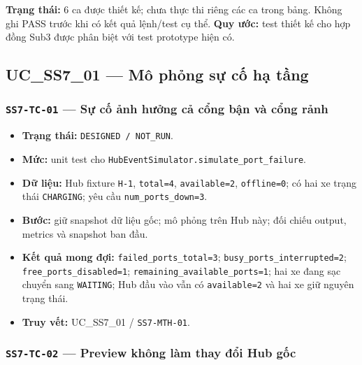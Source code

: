 \documentclass[11pt,a4paper]{article}
\providecommand{\tightlist}{%
  \setlength{\itemsep}{0pt}\setlength{\parskip}{0pt}}
\begin{document}
\textbf{Trạng thái:} 6 ca được thiết kế; chưa thực thi riêng các ca
trong bảng. Không ghi PASS trước khi có kết quả lệnh/test cụ thể.
\textbf{Quy ước:} test thiết kế cho hợp đồng Sub3 được phân biệt với
test prototype hiện có.

\hypertarget{uc_ss7_01-muxf4-phux1ecfng-sux1ef1-cux1ed1-hux1ea1-tux1ea7ng}{%
\subsection{UC\_SS7\_01 --- Mô phỏng sự cố hạ
tầng}\label{uc_ss7_01-muxf4-phux1ecfng-sux1ef1-cux1ed1-hux1ea1-tux1ea7ng}}

\hypertarget{ss7-tc-01-sux1ef1-cux1ed1-ux1ea3nh-hux1b0ux1edfng-cux1ea3-cux1ed5ng-bux1eadn-vuxe0-cux1ed5ng-rux1ea3nh}{%
\subsubsection{\texorpdfstring{\texttt{SS7-TC-01} --- Sự cố ảnh hưởng cả
cổng bận và cổng
rảnh}{SS7-TC-01 --- Sự cố ảnh hưởng cả cổng bận và cổng rảnh}}\label{ss7-tc-01-sux1ef1-cux1ed1-ux1ea3nh-hux1b0ux1edfng-cux1ea3-cux1ed5ng-bux1eadn-vuxe0-cux1ed5ng-rux1ea3nh}}

\begin{itemize}
\tightlist
\item
  \textbf{Trạng thái:} \texttt{DESIGNED\ /\ NOT\_RUN}.
\item
  \textbf{Mức:} unit test cho
  \texttt{HubEventSimulator.simulate\_port\_failure}.
\item
  \textbf{Dữ liệu:} Hub fixture \texttt{H-1}, \texttt{total=4},
  \texttt{available=2}, \texttt{offline=0}; có hai xe trạng thái
  \texttt{CHARGING}; yêu cầu \texttt{num\_ports\_down=3}.
\item
  \textbf{Bước:} giữ snapshot dữ liệu gốc; mô phỏng trên Hub này; đối
  chiếu output, metrics và snapshot ban đầu.
\item
  \textbf{Kết quả mong đợi:} \texttt{failed\_ports\_total=3};
  \texttt{busy\_ports\_interrupted=2}; \texttt{free\_ports\_disabled=1};
  \texttt{remaining\_available\_ports=1}; hai xe đang sạc chuyển sang
  \texttt{WAITING}; Hub đầu vào vẫn có \texttt{available=2} và hai xe
  giữ nguyên trạng thái.
\item
  \textbf{Truy vết:} UC\_SS7\_01 / \texttt{SS7-MTH-01}.
\end{itemize}

\hypertarget{ss7-tc-02-preview-khuxf4ng-luxe0m-thay-ux111ux1ed5i-hub-gux1ed1c}{%
\subsubsection{\texorpdfstring{\texttt{SS7-TC-02} --- Preview không làm
thay đổi Hub
gốc}{SS7-TC-02 --- Preview không làm thay đổi Hub gốc}}\label{ss7-tc-02-preview-khuxf4ng-luxe0m-thay-ux111ux1ed5i-hub-gux1ed1c}}
\end{document}

